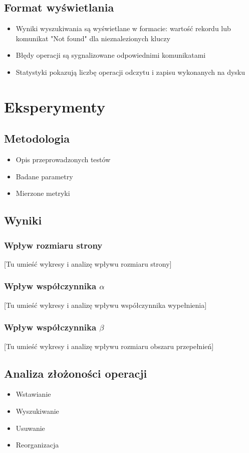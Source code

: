 \documentclass[12pt]{article}
\begin{document}
\subsection{Format wyświetlania}
\begin{itemize}
    \item Wyniki wyszukiwania są wyświetlane w formacie: wartość rekordu lub komunikat "Not found" dla nieznalezionych kluczy
    \item Błędy operacji są sygnalizowane odpowiednimi komunikatami
    \item Statystyki pokazują liczbę operacji odczytu i zapisu wykonanych na dysku
\end{itemize}

\section{Eksperymenty}
\subsection{Metodologia}
\begin{itemize}
    \item Opis przeprowadzonych testów
    \item Badane parametry
    \item Mierzone metryki
\end{itemize}

\subsection{Wyniki}
\subsubsection{Wpływ rozmiaru strony}
[Tu umieść wykresy i analizę wpływu rozmiaru strony]

\subsubsection{Wpływ współczynnika $\alpha$}
[Tu umieść wykresy i analizę wpływu współczynnika wypełnienia]

\subsubsection{Wpływ współczynnika $\beta$}
[Tu umieść wykresy i analizę wpływu rozmiaru obszaru przepełnień]

\subsection{Analiza złożoności operacji}
\begin{itemize}
    \item Wstawianie
    \item Wyszukiwanie
    \item Usuwanie
    \item Reorganizacja
\end{itemize}
\end{document}

